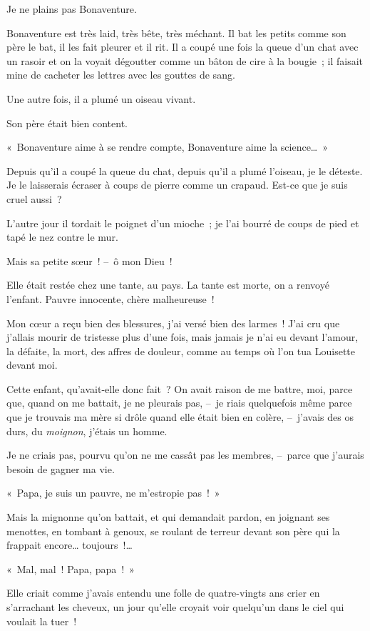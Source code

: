 \documentclass[french,twoside]{book} %
\begin{document}
Je ne plains pas Bonaventure.\par
Bonaventure est très laid, très bête, très méchant. Il bat les petits comme son père le bat, il les fait pleurer et il rit. Il a coupé une fois la queue d’un chat avec un rasoir et on la voyait dégoutter comme un bâton de cire à la bougie ; il faisait mine de cacheter les lettres avec les gouttes de sang.\par
Une autre fois, il a plumé un oiseau vivant.\par
Son père était bien content.\par
« Bonaventure aime à se rendre compte, Bonaventure aime la science… »\par
Depuis qu’il a coupé la queue du chat, depuis qu’il a plumé l’oiseau, je le déteste. Je le laisserais écraser à coups de pierre comme un crapaud. Est-ce que je suis cruel aussi ?\par
L’autre jour il tordait le poignet d’un mioche ; je l’ai bourré de coups de pied et tapé le nez contre le mur.\par
\bigbreak
\noindent Mais sa petite sœur ! – ô mon Dieu !\par
\bigbreak
\noindent Elle était restée chez une tante, au pays. La tante est morte, on a renvoyé l’enfant. Pauvre innocente, chère malheureuse !\par
Mon cœur a reçu bien des blessures, j’ai versé bien des larmes ! J’ai cru que j’allais mourir de tristesse plus d’une fois, mais jamais je n’ai eu devant l’amour, la défaite, la mort, des affres de douleur, comme au temps où l’on tua Louisette devant moi.\par
Cette enfant, qu’avait-elle donc fait ? On avait raison de me battre, moi, parce que, quand on me battait, je ne pleurais pas, – je riais quelquefois même parce que je trouvais ma mère si drôle quand elle était bien en colère, – j’avais des os durs, du \emph{moignon}, j’étais un homme.\par
Je ne criais pas, pourvu qu’on ne me cassât pas les membres, – parce que j’aurais besoin de gagner ma vie.\par
« Papa, je suis un pauvre, ne m’estropie pas ! »\par
Mais la mignonne qu’on battait, et qui demandait pardon, en joignant ses menottes, en tombant à genoux, se roulant de terreur devant son père qui la frappait encore… toujours !…\par
« Mal, mal ! Papa, papa ! »\par
Elle criait comme j’avais entendu une folle de quatre-vingts ans crier en s’arrachant les cheveux, un jour qu’elle croyait voir quelqu’un dans le ciel qui voulait la tuer !\par
\end{document}
